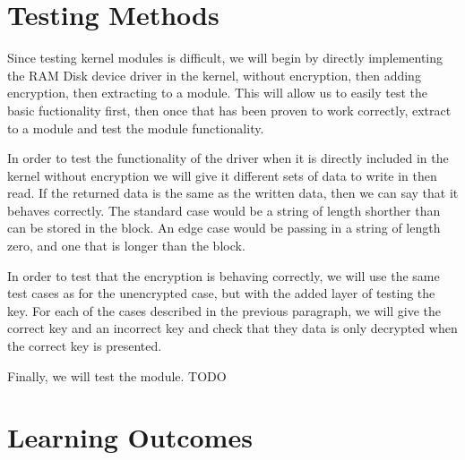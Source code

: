 \documentclass[letterpaper,10pt]{article}
\begin{document}
\section{Testing Methods}
Since testing kernel modules is difficult, we will begin by directly implementing the RAM Disk device 
driver in the kernel, without encryption, then adding encryption, then extracting to a module. 
This will allow us to easily test the basic fuctionality first, then once that has been proven to work 
correctly, extract to a module and test the module functionality.

In order to test the functionality of the driver when it is directly included in the kernel without 
encryption we will give it different sets of data to write in then read. If the returned data is the 
same as the written data, then we can say that it behaves correctly. The standard case would be a string
 of length shorther than can be stored in the block. An edge case would be passing in a string of length
 zero, and one that is longer than the block.

In order to test that the encryption is behaving correctly, we will use the same test cases as for the 
unencrypted case, but with the added layer of testing the key. 
For each of the cases described in the previous paragraph, we will give the correct key and an incorrect
 key and check that they data is only decrypted when the correct key is presented.

Finally, we will test the module. TODO

\section{Learning Outcomes}
\end{document}
